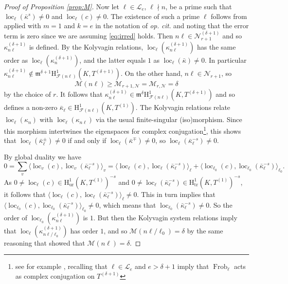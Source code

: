 \documentclass[10pt,reqno]{amsart}
\numberwithin{equation}{section}
\theoremstyle{plain}
\theoremstyle{definition}
\theoremstyle{definition}
\theoremstyle{plain}
\theoremstyle{plain}
\theoremstyle{plain}
\theoremstyle{plain}
\theoremstyle{plain}
\theoremstyle{plain}
\DeclareMathOperator{\frob}{Frob}
\DeclareMathOperator{\loc}{loc}
\newcommand{\cF}{\mathcal{F}}
\newcommand{\cL}{\mathcal{L}}
\newcommand{\cN}{\mathcal{N}}
\newcommand{\kap}{\kappa}
\newcommand{\fm}{\mathfrak{m}}
\newcommand{\rH}{\mathrm{H}}
\begin{document}
\begin{proof}[Proof of Proposition \ref{prop:M}]
Now let $\ell\in\cL_e$, $\ell\nmid n$, be a prime such that $\loc_\ell(\bar\kap^s)\neq 0$ and $\loc_\ell(c)\neq 0$. The existence of such a prime $\ell$ follows from \cite[Prop. 6.3.1]{eisenstein_cyc} applied with $m=1$ and $k=e$ in the notation of \emph{op. cit.} and noting that the error term is zero since we are assuming \eqref{eq:irred} holds. Then $n\ell \in \cN_{r+1}^{(\delta+1)}$ and so $\kap_{n\ell}^{(\delta+1)}$ is defined. 
By the Kolyvagin relations, $\loc_\ell(\kap_{n\ell}^{(\delta+1)})$ has the same order as $\loc_\ell(\kap_n^{(\delta+1)})$, and the latter equals $1$ as 
$\loc_\ell(\bar\kap)\neq 0$. In particular $\kap_{n\ell}^{(\delta+1)}\not\in\mathfrak{m}^{\delta+1}\rH^1_{\cF(n\ell)}(K,T^{(\delta+1)})$. On the other hand, $n\ell \in \cN_{r+1}$,
so $$\mathscr{M}(n\ell)\geq \mathscr{M}_{r+1,\cN} = \mathscr{M}_{r,\cN} = \delta$$ by the choice of $r$. It follows that $\kap_{n\ell}^{(\delta+1)} \in \fm^\delta\rH^1_{\cF(n\ell)}(K,T^{(\delta+1)})$
and so defines a non-zero $\bar\kap_\ell \in \rH^1_{\cF(n\ell)}(K,T^{(1)})$.
The Kolyvagin relations relate $\loc_\ell(\kappa_n)$ with $\loc_\ell(\kappa_{n\ell})$ via the usual finite-singular (iso)morphism. Since this morphism intertwines the eigenspaces for complex conjugation\footnote{see for example \cite[5.15.1]{nekovar}, recalling that $\ell\in\cL_{e}$  and $e>\delta+1$ imply that $\frob_\ell$ acts as complex conjugation on $T^{(\delta+1)}$}, this shows that $\loc_\ell(\bar\kap_\ell^\pm)\neq 0$ if and only if $\loc_\ell(\bar\kap^\mp)\neq 0$, so
$\loc_\ell(\bar\kap_\ell^{-s}) \neq 0$. 

By global duality we have
$$
0 = \sum_{v} \langle \loc_v(c), \loc_v(\bar\kap_\ell^{-s})\rangle_v  = \langle \loc_\ell(c), \loc_\ell(\bar\kap_\ell^{-s})\rangle_\ell  + \langle \loc_{\ell_0}(c), \loc_{\ell_0}(\bar\kap_\ell^{-s})\rangle_{\ell_0}.
$$
As $0\neq \loc_\ell(c)\in \rH^1_\mathrm{ur}(K,T^{(1)})^{-s}$ and $0\neq \loc_\ell(\bar\kap_\ell^{-s}) \in \rH^1_{\mathrm{tr}}(K,T^{(1)})^{-s}$, it follows
that $\langle \loc_\ell(c), \loc_\ell(\bar\kap_\ell^{-s})\rangle_\ell\neq 0$. This in turn implies that $\langle \loc_{\ell_0}(c), \loc_{\ell_0}(\bar\kap_\ell^{-s})\rangle_{\ell_0}\neq 0$, which means that $\loc_{\ell_0}(\bar\kap_\ell^{-s})\neq 0$. So the order of $\loc_{\ell_0}(\kap_{n\ell}^{(\delta+1)})$ is $1$. But then the Kolyvagin system relations imply that 
$\loc_\ell(\kap_{n\ell/\ell_0}^{(\delta+1)})$ has order $1$, and so $\mathscr{M}(n\ell/\ell_0) = \delta$ by the same reasoning that showed that $\mathscr{M}(n\ell) = \delta$. 
\end{proof}
\end{document}

